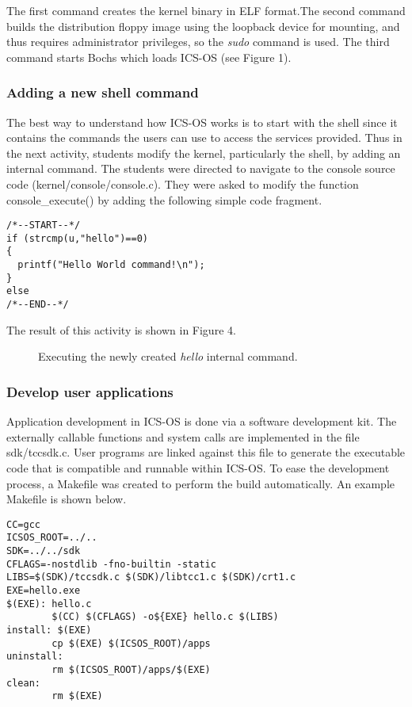 \documentclass{acm_proc_article-sp}
\begin{document}
The first command creates the kernel binary in ELF format.The second command 
builds the distribution floppy image using the loopback device for mounting,
and thus requires administrator privileges, so the \textit{sudo} command is used.
The third command starts Bochs\cite{bochs:site} which loads ICS-OS (see 
Figure 1).

\subsubsection{Adding a new shell command}
The best way to understand how ICS-OS works is to start with the shell since 
it contains the commands the users can use to access the services provided.
Thus in the next activity,  students modify the kernel,
particularly the shell, by adding an internal command. The students were
directed to navigate to the console source code (kernel/console/console.c). 
They were asked to modify the function console\_execute() by adding the 
following simple code fragment.

\begin{verbatim}
/*--START--*/
if (strcmp(u,"hello")==0)
{
  printf("Hello World command!\n");
}
else
/*--END--*/
\end{verbatim}

The result of this activity is shown in Figure 4.

\begin{figure}
\centering
{}
\caption{Executing the newly created \textit{hello} internal command.}
\end{figure}


\subsubsection{Develop user applications}
Application development in ICS-OS is done via a software development kit.
The externally callable functions and system calls are implemented in the file 
sdk/tccsdk.c. User programs are linked against this file to generate the
executable code that is compatible and runnable within ICS-OS. To ease the 
development process, a Makefile was created to perform the build
automatically. An example Makefile is shown below.

\begin{verbatim}
CC=gcc
ICSOS_ROOT=../..
SDK=../../sdk
CFLAGS=-nostdlib -fno-builtin -static
LIBS=$(SDK)/tccsdk.c $(SDK)/libtcc1.c $(SDK)/crt1.c
EXE=hello.exe
$(EXE): hello.c
        $(CC) $(CFLAGS) -o${EXE} hello.c $(LIBS)
install: $(EXE)
        cp $(EXE) $(ICSOS_ROOT)/apps
uninstall:
        rm $(ICSOS_ROOT)/apps/$(EXE)
clean:
        rm $(EXE)
\end{verbatim}
\end{document}
